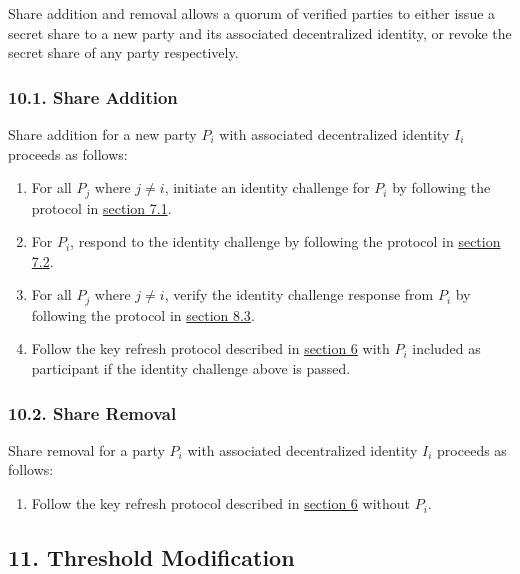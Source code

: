 \documentclass[
]{article}
\providecommand{\tightlist}{%
  \setlength{\itemsep}{0pt}\setlength{\parskip}{0pt}}
\begin{document}
Share addition and removal allows a quorum of verified parties to either
issue a secret share to a new party and its associated decentralized
identity, or revoke the secret share of any party respectively.

\hypertarget{share-addition}{%
\subsubsection{10.1. Share Addition}\label{share-addition}}

Share addition for a new party \(P_i\) with associated decentralized
identity \(I_i\) proceeds as follows:

\begin{enumerate}
\def\labelenumi{\arabic{enumi}.}
\tightlist
\item
  For all \(P_j\) where \(j \neq i\), initiate an identity challenge for
  \(P_i\) by following the protocol in
  \protect\hyperlink{identity-authed-request-initiation}{section 7.1}.
\item
  For \(P_i\), respond to the identity challenge by following the
  protocol in
  \protect\hyperlink{identity-authed-request-verification}{section 7.2}.
\item
  For all \(P_j\) where \(j \neq i\), verify the identity challenge
  response from \(P_i\) by following the protocol in
  \protect\hyperlink{identity-challenge-verification}{section 8.3}.
\item
  Follow the key refresh protocol described in
  \protect\hyperlink{key-refresh}{section 6} with \(P_i\) included as
  participant if the identity challenge above is passed.
\end{enumerate}

\hypertarget{share-removal}{%
\subsubsection{10.2. Share Removal}\label{share-removal}}

Share removal for a party \(P_i\) with associated decentralized identity
\(I_i\) proceeds as follows:

\begin{enumerate}
\def\labelenumi{\arabic{enumi}.}
\tightlist
\item
  Follow the key refresh protocol described in
  \protect\hyperlink{key-refresh}{section 6} without \(P_i\).
\end{enumerate}

\hypertarget{threshold-modification}{%
\subsection{11. Threshold Modification}\label{threshold-modification}}
\end{document}
